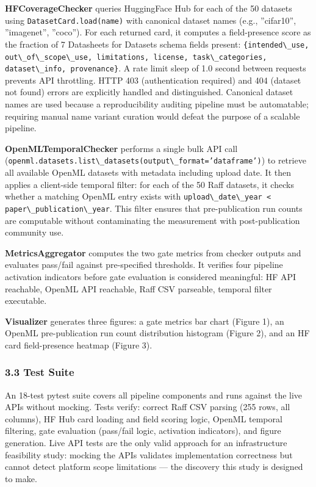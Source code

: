\textbf{HFCoverageChecker} queries HuggingFace Hub for each of the 50 datasets using \texttt{DatasetCard.load(name)} with canonical dataset names (e.g., ''cifar10'', ''imagenet'', ''coco''). For each returned card, it computes a field-presence score as the fraction of 7 Datasheets for Datasets schema fields present: \texttt{\{intended\textbackslash \_use, out\textbackslash \_of\textbackslash \_scope\textbackslash \_use, limitations, license, task\textbackslash \_categories, dataset\textbackslash \_info, provenance\}}. A rate limit sleep of 1.0 second between requests prevents API throttling. HTTP 403 (authentication required) and 404 (dataset not found) errors are explicitly handled and distinguished. Canonical dataset names are used because a reproducibility auditing pipeline must be automatable; requiring manual name variant curation would defeat the purpose of a scalable pipeline.

\textbf{OpenMLTemporalChecker} performs a single bulk API call (\texttt{openml.datasets.list\textbackslash \_datasets(output\textbackslash \_format='dataframe')}) to retrieve all available OpenML datasets with metadata including upload date. It then applies a client-side temporal filter: for each of the 50 Raff datasets, it checks whether a matching OpenML entry exists with \texttt{upload\textbackslash \_date\textbackslash \_year < paper\textbackslash \_publication\textbackslash \_year}. This filter ensures that pre-publication run counts are computable without contaminating the measurement with post-publication community use.

\textbf{MetricsAggregator} computes the two gate metrics from checker outputs and evaluates pass/fail against pre-specified thresholds. It verifies four pipeline activation indicators before gate evaluation is considered meaningful: HF API reachable, OpenML API reachable, Raff CSV parseable, temporal filter executable.

\textbf{Visualizer} generates three figures: a gate metrics bar chart (Figure 1), an OpenML pre-publication run count distribution histogram (Figure 2), and an HF card field-presence heatmap (Figure 3).

\subsubsection{3.3 Test Suite}

An 18-test pytest suite covers all pipeline components and runs against the live APIs without mocking. Tests verify: correct Raff CSV parsing (255 rows, all columns), HF Hub card loading and field scoring logic, OpenML temporal filtering, gate evaluation (pass/fail logic, activation indicators), and figure generation. Live API tests are the only valid approach for an infrastructure feasibility study: mocking the APIs validates implementation correctness but cannot detect platform scope limitations --- the discovery this study is designed to make.

